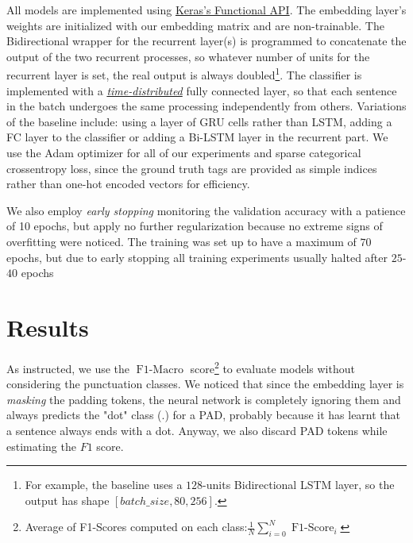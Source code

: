 \documentclass[letterpaper,10.8pt]{article}
\begin{document}

All models are implemented using \href{https://keras.io/guides/functional_api/}{Keras's Functional API}. The embedding layer's weights are initialized with our embedding matrix and are non-trainable. The Bidirectional wrapper for the recurrent layer(s) is programmed to concatenate the output of the two recurrent processes, so whatever number of units for the recurrent layer is set, the real output is always doubled\footnote{For example, the baseline uses a $128$-units Bidirectional LSTM layer, so the output has shape $[batch\_size, 80, 256]$.}. The classifier is implemented with a \href{https://keras.io/api/layers/recurrent_layers/time_distributed/}{\emph{time-distributed}} fully connected layer, so that each sentence in the batch undergoes the same processing independently from others. Variations of the baseline include: using a layer of GRU cells rather than LSTM, adding a FC layer to the classifier or adding a Bi-LSTM layer in the recurrent part. We use the Adam optimizer for all of our experiments and sparse categorical crossentropy loss, since the ground truth tags are provided as simple indices rather than one-hot encoded vectors for efficiency. 

We also employ \emph{early stopping} monitoring the validation accuracy with a patience of 10 epochs, but apply no further regularization because no extreme signs of overfitting were noticed. The training was set up to have a maximum of $70$ epochs, but due to early stopping all training experiments usually halted after $25$-$40$ epochs 

\section{Results}

As instructed, we use the $\operatorname{F1-Macro}$ score\footnote{Average of F1-Scores computed on each class:$ \frac{1}{N}\sum^N_{i=0}\operatorname{F1-Score}_i$} to evaluate models without considering the punctuation classes. We noticed that since the embedding layer is \emph{masking} the padding tokens, the neural network is completely ignoring them and always predicts the "dot" class (.) for a PAD, probably because it has learnt that a sentence always ends with a dot. Anyway, we also discard PAD tokens while estimating the $F1$ score.
\end{document}
